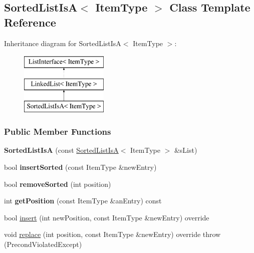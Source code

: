\hypertarget{class_sorted_list_is_a}{}\subsection{Sorted\+List\+IsA$<$ Item\+Type $>$ Class Template Reference}
\label{class_sorted_list_is_a}
Inheritance diagram for Sorted\+List\+IsA$<$ Item\+Type $>$\+:\begin{figure}[H]
\begin{center}
\leavevmode
\includegraphics[height=3.000000cm]{class_sorted_list_is_a}
\end{center}
\end{figure}
\subsubsection*{Public Member Functions}
\begin{DoxyCompactItemize}
\item 
{\bfseries Sorted\+List\+IsA} (const \hyperlink{class_sorted_list_is_a}{Sorted\+List\+IsA}$<$ Item\+Type $>$ \&s\+List)\hypertarget{class_sorted_list_is_a_aaec289770ce0896fc13634fc370a095e}{}\label{class_sorted_list_is_a_aaec289770ce0896fc13634fc370a095e}

\item 
bool {\bfseries insert\+Sorted} (const Item\+Type \&new\+Entry)\hypertarget{class_sorted_list_is_a_a2b9ddfb2a19090085495518681de9b3f}{}\label{class_sorted_list_is_a_a2b9ddfb2a19090085495518681de9b3f}

\item 
bool {\bfseries remove\+Sorted} (int position)\hypertarget{class_sorted_list_is_a_ad8b46e67b19a7188c75491b1ad4bc152}{}\label{class_sorted_list_is_a_ad8b46e67b19a7188c75491b1ad4bc152}

\item 
int {\bfseries get\+Position} (const Item\+Type \&an\+Entry) const \hypertarget{class_sorted_list_is_a_a0fb1533091f08f88a73cd40f460a20c7}{}\label{class_sorted_list_is_a_a0fb1533091f08f88a73cd40f460a20c7}

\item 
bool \hyperlink{class_sorted_list_is_a_aa80ef5215183e3a17f2a2f2e76d4fca3}{insert} (int new\+Position, const Item\+Type \&new\+Entry) override
\item 
void \hyperlink{class_sorted_list_is_a_ae85cca0f8a4a306d6d28cc5993e5895c}{replace} (int position, const Item\+Type \&new\+Entry) override  throw (\+Precond\+Violated\+Except)
\end{DoxyCompactItemize}


